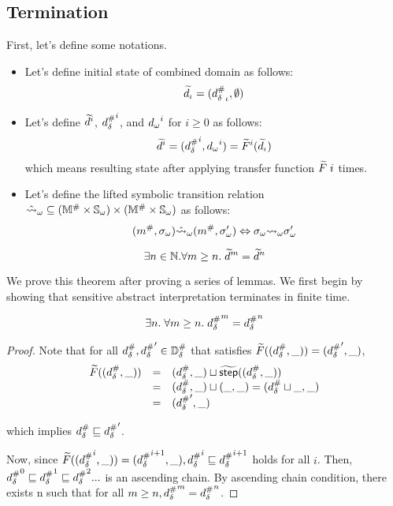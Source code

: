\subsection{Termination}

First, let's define some notations.

\begin{itemize}
\item
Let's define initial state of combined domain as follows:
\[
  \widetilde{d}_\iota = ({{d}^{\#}_\delta}_\iota, \emptyset)
\]
\item
Let's define $\widetilde{d}^i$, ${{d}^{\#}_\delta}^i$, and ${{d}_\omega}^i$ for $i \geq 0$ as follows:
\[
  \widetilde{d}^i = ({{d}^{\#}_\delta}^i, {{d}_\omega}^i) = \widetilde{F}^i(\widetilde{d}_\iota)
\]
which means resulting state after applying transfer function $\widetilde{F} \; i$ times.
\item
Let's define the lifted symbolic transition relation
$\hat{\leadsto}_\omega \subseteq
({\mathbb{M}}^{\#} \times {\mathbb{S}}_\omega) \times ({\mathbb{M}}^{\#} \times {\mathbb{S}}_\omega)$
as follows:
\[
  ({m}^{\#}, {\sigma}_\omega) \hat{\leadsto}_\omega ({m}^{\#}, {\sigma}_\omega') \Leftrightarrow
  {\sigma}_\omega {\leadsto}_\omega {\sigma}_\omega'
\]
\end{itemize}

\begin{theorem}[Termination]\label{theorem:termination}
  \[
    \exists n \in \mathbb{N}. \forall m \geq n. \;
    \widetilde{d}^m = \widetilde{d}^n
  \]
\end{theorem}

We prove this theorem after proving a series of lemmas.
We first begin by showing that sensitive abstract interpretation terminates in
finite time.

\begin{lemma}\label{lemma:sabs-term}
\label{theorem:sabs-termination}
  \[
    \exists n. \; \forall m \geq n. \;
    {{d}^{\#}_\delta}^m = {{d}^{\#}_\delta}^n
  \]
\end{lemma}

\begin{proof}
Note that for all ${{d}^{\#}_\delta}, {{d}^{\#}_\delta}' \in {\mathbb{D}}^{\#}_\delta$ that satisfies
$\widetilde{F}(({{d}^{\#}_\delta}, \_)) = ({{d}^{\#}_\delta}', \_)$,
\[
  \begin{array}{rcl}
  \widetilde{F}(({{d}^{\#}_\delta}, \_))
  &=& ({{d}^{\#}_\delta}, \_) \sqcup \widetilde{\textsf{step}}(({{d}^{\#}_\delta}, \_))\\
  &=& ({{d}^{\#}_\delta}, \_) \sqcup (\_, \_) = ({{d}^{\#}_\delta} \sqcup \_, \_)\\
  &=& ({{d}^{\#}_\delta}', \_)
  \end{array}
\]

which implies ${{d}^{\#}_\delta} \sqsubseteq {{d}^{\#}_\delta}'$.

Now, since $\widetilde{F}(({{d}^{\#}_\delta}^i, \_)) = ({{d}^{\#}_\delta}^{i+1}, \_),
{{d}^{\#}_\delta}^i \sqsubseteq {{d}^{\#}_\delta}^{i+1}$ holds for all $i$.
Then, ${{d}^{\#}_\delta}^0 \sqsubseteq {{d}^{\#}_\delta}^1 \sqsubseteq {{d}^{\#}_\delta}^2 ...$ is an ascending chain.
By ascending chain condition, there exists n such that
for all $m \geq n, {{d}^{\#}_\delta}^m = {{d}^{\#}_\delta}^n$.
\end{proof}

